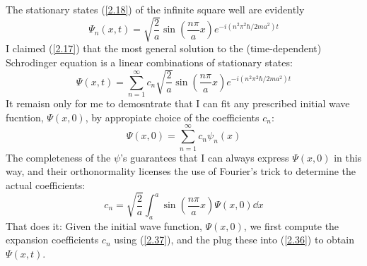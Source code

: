 The stationary states (\ref{2.18}) of the infinite square well are evidently
\begin{equation}\label{2.35}
	\Psi_n(x,t)=\sqrt{\frac{2}{a}}\sin\left(\frac{n\pi}{a}x\right)e^{-i(n^2\pi^2\hbar/2ma^2)t}
\end{equation}
I claimed (\ref{2.17}) that the most general solution to the (time-dependent) Schrodinger equation is a linear combinations of stationary states:
\begin{equation}\label{2.36}
	\Psi(x,t)=\sum_{n=1}^\infty c_n\sqrt{\frac{2}{a}}\sin\left(\frac{n\pi}{a}x\right)e^{-i(n^2\pi^2\hbar/2ma^2)t}
\end{equation}
It remaisn only for me to demosntrate that I can fit any prescribed initial wave fucntion, $\Psi(x,0)$, by appropiate choice of the coefficients $c_n$:
\begin{equation*}
	\Psi(x,0)=\sum_{n=1}^\infty c_n\psi_n(x)
\end{equation*}
The completeness of the $\psi$'s guarantees that I can always express $\Psi(x,0)$ in this way, and their orthonormality licenses the use of Fourier's trick to determine the actual coefficients:
\begin{equation}\label{2.37}
	c_n=\sqrt{\frac{2}{a}}\int_a^{a}\sin\left(\frac{n\pi}{a}x\right)\Psi(x,0)\dd x
\end{equation}
That does it: Given the initial wave function, $\Psi(x,0)$, we first compute the expansion coefficients $c_n$ using (\ref{2.37}), and the plug these into (\ref{2.36}) to obtain $\Psi(x,t)$.















